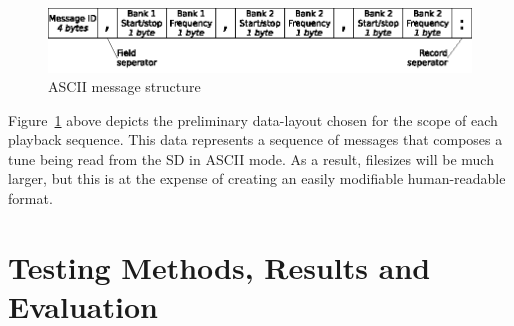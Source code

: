 \documentclass[bibtotocnumbered,abstract=on,paper=a4,fontsize=12pt,parskip=on,halfparskip=on]{scrartcl}		%
\begin{document}
    \begin{figure}[h!]
      \centering
        \includegraphics[]{img/fig_asciimessage}
        \caption{ASCII message structure}
        \label{fig_asciimessage}
    \end{figure}

    Figure~\ref{fig_asciimessage} above depicts the preliminary data-layout chosen for the scope of each playback sequence. This data represents a sequence of messages that composes a tune being read from the SD in ASCII mode. As a result, filesizes will be much larger, but this is at the expense of creating an easily modifiable human-readable format. 

\section{Testing Methods, Results and Evaluation}
\end{document}
